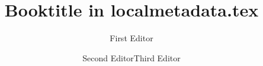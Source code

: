 \title{Booktitle in localmetadata.tex}
\author{First Editor\and Second Editor\lastand Third Editor}
\renewcommand{\lsSeries}{sidl}%
\renewcommand{\lsSeriesNumber}{}
